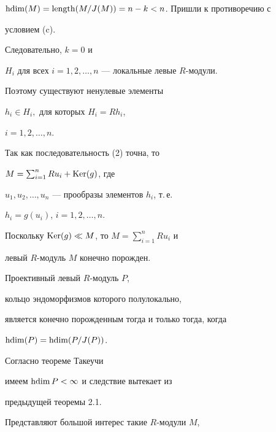 \begin{pf}
$\operatorname{hdim} (M)=\operatorname{length}(M/ J(M)) =n-k < n$. Пришли к противоречию с 


условием (c). 





Следовательно, $k=0$ и 


$H_i$ для всех $i=1,2, \dotsc,n$ --- локальные левые $R$-модули. 


Поэтому существуют ненулевые элементы 


$h_i \in H_i,$ для которых $H_i = R h_{i}$, 


$i=1,2,\dotsc,n$.





Так как последовательность (2) точна, то 


$M=\sum \nolimits_{i=1}^{n} R u_i +\operatorname{Ker}(g)$, где 


$u_1,u_2, \dotsc, u_n$ --- прообразы элементов $h_i$, т.\,е.


$h_{i}= g(u_{i})$, $i=1,2,\dotsc,n$.


Поскольку $\operatorname{Ker}(g) \ll M$, то $M = \sum_{i=1}^n R u_{i}$ и 


левый $R$-модуль $M$ конечно порожден. 


\end{pf}


 


\begin{cors} 


Проективный левый $R$-модуль $P$, 


кольцо эндоморфизмов которого полулокально, 


является конечно порожденным тогда и только тогда, когда


$\operatorname{hdim}(P) = \operatorname{hdim}(P/ J(P))$. 


\end{cors}





\begin{pf}


Согласно теореме Такеучи 


имеем $\operatorname{hdim}{P} < \infty$ и следствие вытекает из 


предыдущей теоремы 2.1. 


\end{pf}


 


Представляют большой интерес такие $R$-модули $M$,



